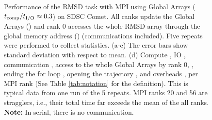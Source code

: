 \begin{figure}[ht!]
\caption{Performance of the RMSD task with MPI using Global Arrays (${t}_{\text{comp}}/{t}_{\text{I/O}} \approx 0.3$) on SDSC Comet.
All ranks update the Global Arrays () and rank 0 accesses the whole RMSD array through the global memory address () (communications included).
Five repeats were performed to collect statistics. (a-c) The error bars show standard deviation with respect to mean. 
(d) Compute \tcomp, IO \tIO, communication \tcomm, access to the whole Global Arrays by rank 0, , ending the for loop ,
  opening the trajectory , and overheads ,  per MPI rank (See Table \ref{tab:notation} for the definition). 
  This is typical data from one run of the 5 repeats. MPI ranks 20 and 56 are stragglers, i.e., 
their total time far exceeds the mean of the all ranks. \textbf{Note:} In serial, there is no communication.}
\label{fig:MPIwithIO-ga4py}
\end{figure}

